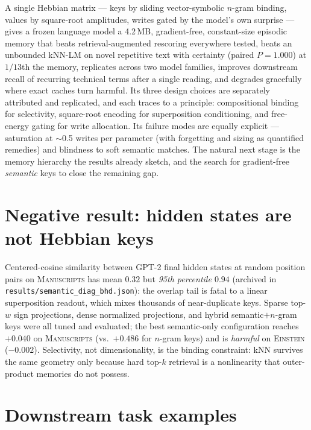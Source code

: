 \documentclass[11pt]{article}
\begin{document}
A single Hebbian matrix --- keys by sliding vector-symbolic $n$-gram binding, values by square-root amplitudes, writes gated by the model's own surprise --- gives a frozen language model a 4.2\,MB, gradient-free, constant-size episodic memory that beats retrieval-augmented rescoring everywhere tested, beats an unbounded kNN-LM on novel repetitive text with certainty (paired $P = 1.000$) at $1/13$th the memory, replicates across two model families, improves downstream recall of recurring technical terms after a single reading, and degrades gracefully where exact caches turn harmful. Its three design choices are separately attributed and replicated, and each traces to a principle: compositional binding for selectivity, square-root encoding for superposition conditioning, and free-energy gating for write allocation. Its failure modes are equally explicit --- saturation at $\sim$0.5 writes per parameter (with forgetting and sizing as quantified remedies) and blindness to soft semantic matches. The natural next stage is the memory hierarchy the results already sketch, and the search for gradient-free \emph{semantic} keys to close the remaining gap.

\appendix

\section{Negative result: hidden states are not Hebbian keys}\label{app:negative}

Centered-cosine similarity between GPT-2 final hidden states at random position pairs on \textsc{Manuscripts} has mean $0.32$ but \emph{95th percentile $0.94$} (archived in \texttt{results/semantic\_diag\_bhd.json}): the overlap tail is fatal to a linear superposition readout, which mixes thousands of near-duplicate keys. Sparse top-$w$ sign projections, dense normalized projections, and hybrid semantic$+$$n$-gram keys were all tuned and evaluated; the best semantic-only configuration reaches $+0.040$ on \textsc{Manuscripts} (vs.\ $+0.486$ for $n$-gram keys) and is \emph{harmful} on \textsc{Einstein} ($-0.002$). Selectivity, not dimensionality, is the binding constraint: kNN survives the same geometry only because hard top-$k$ retrieval is a nonlinearity that outer-product memories do not possess.

\section{Downstream task examples}\label{app:examples}
\end{document}
